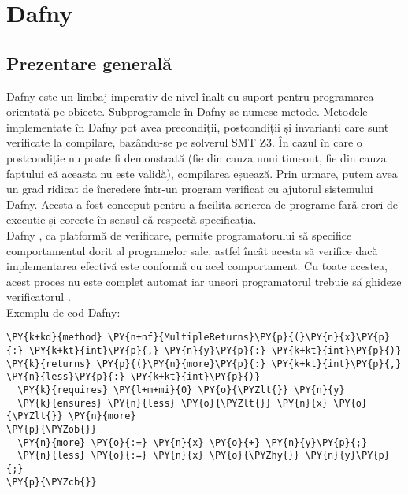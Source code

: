 \chapter{Dafny}
\section{Prezentare generală}

Dafny este un limbaj imperativ de nivel înalt cu suport pentru programarea orientată pe obiecte. Subprogramele în Dafny se numesc metode.  Metodele implementate în Dafny
pot avea precondiții, postcondiții și invarianți care sunt verificate la compilare, bazându-se pe solverul SMT Z3. În cazul în care o postcondiție nu poate fi demonstrată (fie din cauza unui timeout, fie din cauza faptului că aceasta nu este validă), compilarea eșuează. Prin urmare, putem avea un grad ridicat de încredere într-un program verificat cu ajutorul sistemului Dafny.
Acesta a fost conceput pentru a facilita scrierea de programe fară erori de execuție și corecte în sensul că respectă specificația.\\
Dafny \cite{DBLP:journals/corr/abs-1909-01743}, ca platformă de verificare,  permite programatorului să specifice comportamentul dorit al programelor sale, astfel încât acesta să verifice dacă implementarea efectivă este conformă cu acel comportament. Cu toate acestea, acest proces nu este complet automat iar uneori programatorul trebuie să ghideze verificatorul \cite{DBLP:journals/jlap/BlazquezMS23}.\\

Exemplu de cod Dafny:
\begin{small}
\begin{Verbatim}[commandchars=\\\{\}, fontsize=\small]
\PY{k+kd}{method} \PY{n+nf}{MultipleReturns}\PY{p}{(}\PY{n}{x}\PY{p}{:} \PY{k+kt}{int}\PY{p}{,} \PY{n}{y}\PY{p}{:} \PY{k+kt}{int}\PY{p}{)} \PY{k}{returns} \PY{p}{(}\PY{n}{more}\PY{p}{:} \PY{k+kt}{int}\PY{p}{,} \PY{n}{less}\PY{p}{:} \PY{k+kt}{int}\PY{p}{)}
  \PY{k}{requires} \PY{l+m+mi}{0} \PY{o}{\PYZlt{}} \PY{n}{y}
  \PY{k}{ensures} \PY{n}{less} \PY{o}{\PYZlt{}} \PY{n}{x} \PY{o}{\PYZlt{}} \PY{n}{more}
\PY{p}{\PYZob{}}
  \PY{n}{more} \PY{o}{:=} \PY{n}{x} \PY{o}{+} \PY{n}{y}\PY{p}{;}
  \PY{n}{less} \PY{o}{:=} \PY{n}{x} \PY{o}{\PYZhy{}} \PY{n}{y}\PY{p}{;}
\PY{p}{\PYZcb{}}
\end{Verbatim}
\end{small}
